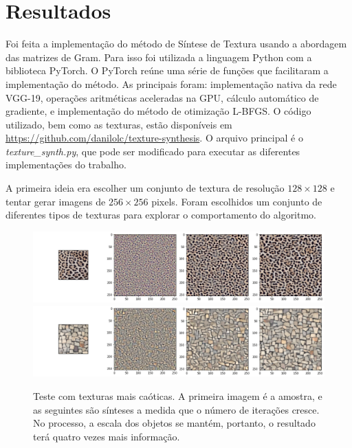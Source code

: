 \chapter{Resultados}


Foi feita a implementação do
método de Síntese de Textura
usando a abordagem das matrizes
de Gram. 
Para isso foi utilizada 
a linguagem Python com a
biblioteca PyTorch.
O PyTorch reúne uma série de
funções que facilitaram
a implementação do método.
As principais foram: implementação
nativa da rede VGG-19, operações
aritméticas aceleradas na GPU,
cálculo automático de gradiente,
e implementação do método de
otimização L-BFGS.
O código utilizado, bem como
as texturas, estão disponíveis
em \url{https://github.com/danilolc/texture-synthesis}.
O arquivo principal é o \textit{texture\_synth.py},
que pode ser modificado para
executar as diferentes implementações
do trabalho.


A primeira ideia era escolher um
conjunto de textura de resolução
$128 \times 128$ e tentar gerar
imagens de $256 \times 256$ pixels.
Foram escolhidos um conjunto de
diferentes tipos de texturas 
para explorar o comportamento
do algoritmo.



\begin{figure}[!ht]
	\centering
	\includegraphics[width=\linewidth]{files/assets/results/result2.png}
	\includegraphics[width=\linewidth]{files/assets/results/result5.png}
	\caption{Teste com texturas mais caóticas. A primeira imagem
	é a amostra, e as seguintes são sínteses a medida que
	o número de iterações cresce.
	No processo, a escala dos objetos se mantém, portanto, o resultado
	terá quatro vezes mais informação.}
	\label{img:preview}
\end{figure}


